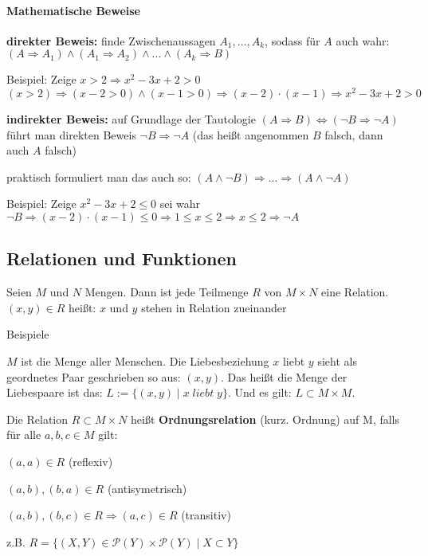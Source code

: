 \paragraph{Mathematische Beweise}
\begin{compactitem}
	\item \textbf{direkter Beweis:} finde Zwischenaussagen $A_1,...,A_k$, sodass f\"ur $A$ auch wahr: \\
	$(A \Rightarrow A_1) \land (A_1 \Rightarrow A_2) \land ... \land (A_k \Rightarrow B)$
	\item Beispiel: Zeige $x > 2 \Rightarrow x^2-3x+2>0$ \\
	$(x>2) \Rightarrow (x-2>0) \land (x-1>0) \Rightarrow (x-2) \cdot (x-1) \Rightarrow x^2-3x+2>0$
	\item \textbf{indirekter Beweis:} auf Grundlage der Tautologie $(A \Rightarrow B) \iff 
	(\lnot B \Rightarrow \lnot A)$  f\"uhrt man direkten Beweis $\lnot B \Rightarrow \lnot A$ (das 
	hei{\ss}t angenommen $B$ falsch, dann auch $A$ falsch)
	\item praktisch formuliert man das auch so: $(A \land \lnot B) \Rightarrow ... \Rightarrow (A 
	\land \lnot A)$
	\item Beispiel: Zeige $x^2-3x+2 \le 0$ sei wahr \\
	$\lnot B \Rightarrow (x-2) \cdot (x-1) \le 0 \Rightarrow 1 \le x \le 2 \Rightarrow x \le 2
	\Rightarrow \lnot A$
\end{compactitem}

\subsection{Relationen und Funktionen}
\begin{mydef}[Relation]
	Seien $M$ und $N$ Mengen. Dann ist jede Teilmenge $R$ von 
	$M \times N$ eine Relation. \\
	$(x,y) \in R$ hei{\ss}t: $x$ und $y$ stehen in Relation zueinander
\end{mydef}
Beispiele
\begin{exmp}
	$M$ ist die Menge aller Menschen. Die Liebesbeziehung $x$ liebt $y$ sieht als geordnetes Paar
	geschrieben so aus: $(x,y)$. Das hei{\ss}t die Menge der Liebespaare ist das: $L := \{(x,y) \mid
	x \; liebt \; y\}$. Und es gilt: $L \subset M \times M$.
\end{exmp}

Die Relation $R \subset M \times N$ hei{\ss}t \textbf{Ordnungsrelation} (kurz. Ordnung) auf M, falls 			f\"ur alle $a,b,c \in M$ gilt:
\begin{compactitem}
	\item $(a,a) \in R$ (reflexiv)
	\item $(a,b),(b,a) \in R$ (antisymetrisch)
	\item $(a,b), (b,c) \in R \Rightarrow (a,c) \in R$ (transitiv)
	\item z.B. $R = \{(X,Y) \in \mathcal P(Y) \times \mathcal P(Y) \mid X \subset Y\}$
\end{compactitem}

